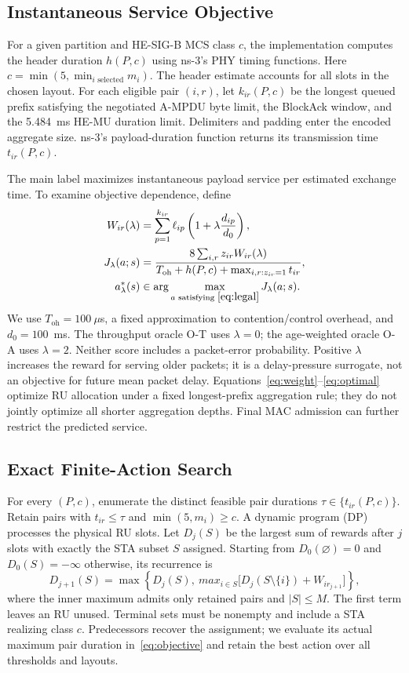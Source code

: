 \documentclass[lettersize,journal]{IEEEtran}
\begin{document}
\subsection{Instantaneous Service Objective}
For a given partition and HE-SIG-B MCS class $c$, the implementation computes
the header duration $h(P,c)$ using ns-3's PHY timing functions. Here
$c=\min(5,\min_{i\text{ selected}}m_i)$. The header estimate accounts for all
slots in the chosen layout. For each eligible pair $(i,r)$, let $k_{ir}(P,c)$
be the longest queued prefix satisfying the negotiated A-MPDU byte limit,
the BlockAck window, and the 5.484~ms HE-MU duration limit. Delimiters and
padding enter the encoded aggregate size. ns-3's payload-duration function
returns its transmission time $t_{ir}(P,c)$.

The main label maximizes instantaneous payload service per estimated exchange
time. To examine objective dependence, define
\begin{align}
 W_{ir}(\lambda)&=\sum_{p=1}^{k_{ir}}\ell_{ip}
             \left(1+\lambda\frac{d_{ip}}{d_0}\right),\label{eq:weight}\\
 J_\lambda(a;s)&=
 \frac{8\sum_{i,r}z_{ir}W_{ir}(\lambda)}
 {T_{\mathrm{oh}}+h(P,c)+\max_{i,r:z_{ir}=1}t_{ir}},\label{eq:objective}\\
 a^*_\lambda(s)&\in\arg\max_{a\text{ satisfying }\eqref{eq:legal}}J_\lambda(a;s).
 \label{eq:optimal}
\end{align}
We use $T_{\mathrm{oh}}=100~\mu$s, a fixed approximation to contention/control
overhead, and $d_0=100$~ms. The throughput oracle O-T uses $\lambda=0$;
the age-weighted oracle O-A uses $\lambda=2$. Neither score includes a
packet-error probability. Positive $\lambda$ increases the reward for
serving older packets; it is a delay-pressure surrogate, not an objective
for future mean packet delay. Equations~\eqref{eq:weight}--\eqref{eq:optimal}
optimize RU allocation under a fixed longest-prefix aggregation rule;
they do not jointly optimize all shorter aggregation depths. Final MAC
admission can further restrict the predicted service.

\subsection{Exact Finite-Action Search}
For every $(P,c)$, enumerate the distinct feasible pair durations
$\tau\in\{t_{ir}(P,c)\}$. Retain pairs with $t_{ir}\leq\tau$ and
$\min(5,m_i)\geq c$. A dynamic program (DP) processes the physical RU slots.
Let $D_j(S)$ be the largest sum of rewards after $j$ slots with exactly
the STA subset $S$ assigned. Starting from $D_0(\varnothing)=0$ and
$D_0(S)=-\infty$ otherwise, its recurrence is
\begin{equation}
 D_{j+1}(S)=\max\left\{D_j(S),\ max_{i\in S}
      \big[D_j(S\setminus\{i\})+W_{i r_{j+1}}\big]\right\},
 \label{eq:dp}
\end{equation}
where the inner maximum admits only retained pairs and $|S|\leq M$.
The first term leaves an RU unused. Terminal sets must be nonempty and
include a STA realizing class $c$. Predecessors recover the assignment;
we evaluate its actual maximum pair duration in~\eqref{eq:objective} and
retain the best action over all thresholds and layouts.
\end{document}
